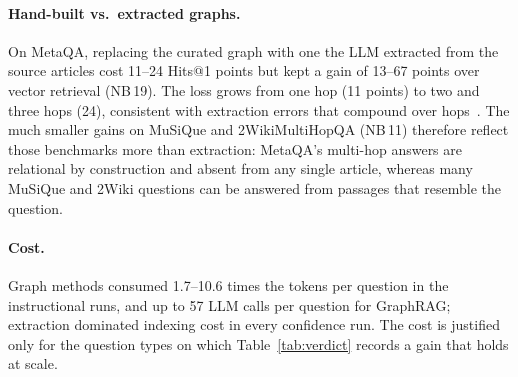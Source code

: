 \documentclass[11pt,a4paper]{article}
\newcommand{\nb}[1]{NB\,#1}
\begin{document}
\paragraph{Hand-built vs.\ extracted graphs.} On MetaQA, replacing the curated graph with one the LLM extracted from
the source articles cost 11--24 Hits@1 points but kept a gain of 13--67 points over vector retrieval (\nb{19}). The
loss grows from one hop (11 points) to two and three hops (24), consistent with extraction errors that compound over
hops~\cite{zhuang2026linearrag}. The much smaller gains on MuSiQue and 2WikiMultiHopQA (\nb{11}) therefore reflect
those benchmarks more than extraction: MetaQA's multi-hop answers are relational by construction and absent from any
single article, whereas many MuSiQue and 2Wiki questions can be answered from passages that resemble the question.

\paragraph{Cost.} Graph methods consumed 1.7--10.6 times the tokens per question in the instructional runs, and up
to 57 LLM calls per question for GraphRAG; extraction dominated indexing cost in every confidence run. The cost
is justified only for the question types on which Table~\ref{tab:verdict} records a gain that holds at scale.
\end{document}

